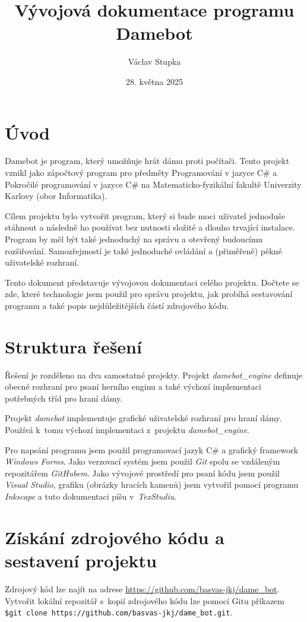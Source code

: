 \documentclass[a4paper,12pt]{article}
\title{Vývojová dokumentace programu Damebot}
\author{Václav Stupka}
\date{28. května 2025}
\begin{document}
	\maketitle
	\tableofcontents
	\section{Úvod}
	Damebot je program, který umožňuje hrát dámu proti počítači. Tento projekt vznikl jako zápočtový program
	pro předměty Programování v jazyce C\# a Pokročilé programování v jazyce C\# na Matematicko-fyzikální fakultě Univerzity
	Karlovy (obor Informatika).
	
	Cílem projektu bylo vytvořit program, který si bude moci uživatel jednoduše stáhnout a následně ho používat
	bez nutnosti složité a dlouho trvající instalace. Program by měl být také jednoduchý na správu a otevřený
	budoucímu rozšiřování. Samozřejmostí je také jednoduché ovládání a (přiměřeně) pěkné uživatelské rozhraní.
	
	Tento dokument představuje vývojovou dokumentaci celého projektu. Dočtete se zde, které technologie
	jsem použil pro správu projektu, jak probíhá sestavování programu a také popis nejdůležitějších částí
	zdrojového kódu.
	
	\section{Struktura řešení}
	Řešení je rozděleno na dva samostatné projekty. Projekt \textit{damebot\_engine} definuje obecné rozhraní pro psaní herního enginu a také výchozí implementaci potřebných tříd pro hraní dámy.
	
	Projekt \textit{damebot} implementuje grafické uživatelské rozhraní pro hraní dámy. Používá k~tomu výchozí implementaci z~projektu \textit{damebot\_engine}.
	
	Pro napsání programu jsem použil programovací jazyk C\# a grafický framework \textit{Windows Forms}. Jako verzovací systém jsem použil \textit{Git} spolu se vzdáleným repozitářem \textit{GitHubem}. Jako vývojové prostředí pro psaní kódu jsem použil \textit{Visual Studio}, grafiku (obrázky hracích kamenů) jsem vytvořil pomocí programu \textit{Inkscape} a tuto dokumentaci píšu v~\textit{TexStudiu}.
	
	\section{Získání zdrojového kódu a sestavení projektu}
	Zdrojový kód lze najít na adrese \url{https://github.com/basvas-jkj/dame_bot}. Vytvořit lokální repozitář
	s~kopií zdrojového kódu lze pomocí Gitu příkazem \verb|$git clone https://github.com/basvas-jkj/dame_bot.git|.
	
\end{document}
